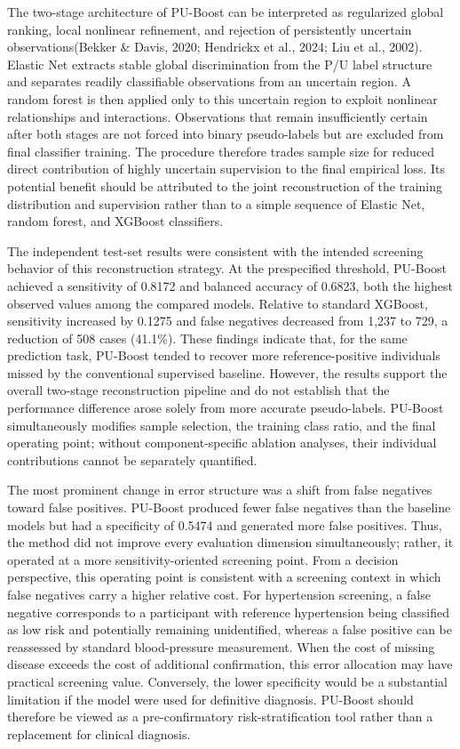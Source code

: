 \documentclass[10pt]{article}
\begin{document}
The two-stage architecture of PU-Boost can be interpreted as regularized
global ranking, local nonlinear refinement, and rejection of
persistently uncertain observations(Bekker \& Davis, 2020; Hendrickx et
al., 2024; Liu et al., 2002). Elastic Net extracts stable global
discrimination from the P/U label structure and separates readily
classifiable observations from an uncertain region. A random forest is
then applied only to this uncertain region to exploit nonlinear
relationships and interactions. Observations that remain insufficiently
certain after both stages are not forced into binary pseudo-labels but
are excluded from final classifier training. The procedure therefore
trades sample size for reduced direct contribution of highly uncertain
supervision to the final empirical loss. Its potential benefit should be
attributed to the joint reconstruction of the training distribution and
supervision rather than to a simple sequence of Elastic Net, random
forest, and XGBoost classifiers.

The independent test-set results were consistent with the intended
screening behavior of this reconstruction strategy. At the prespecified
threshold, PU-Boost achieved a sensitivity of 0.8172 and balanced
accuracy of 0.6823, both the highest observed values among the compared
models. Relative to standard XGBoost, sensitivity increased by 0.1275
and false negatives decreased from 1,237 to 729, a reduction of 508
cases (41.1\%). These findings indicate that, for the same prediction
task, PU-Boost tended to recover more reference-positive individuals
missed by the conventional supervised baseline. However, the results
support the overall two-stage reconstruction pipeline and do not
establish that the performance difference arose solely from more
accurate pseudo-labels. PU-Boost simultaneously modifies sample
selection, the training class ratio, and the final operating point;
without component-specific ablation analyses, their individual
contributions cannot be separately quantified.

The most prominent change in error structure was a shift from false
negatives toward false positives. PU-Boost produced fewer false
negatives than the baseline models but had a specificity of 0.5474 and
generated more false positives. Thus, the method did not improve every
evaluation dimension simultaneously; rather, it operated at a more
sensitivity-oriented screening point. From a decision perspective, this
operating point is consistent with a screening context in which false
negatives carry a higher relative cost. For hypertension screening, a
false negative corresponds to a participant with reference hypertension
being classified as low risk and potentially remaining unidentified,
whereas a false positive can be reassessed by standard blood-pressure
measurement. When the cost of missing disease exceeds the cost of
additional confirmation, this error allocation may have practical
screening value. Conversely, the lower specificity would be a
substantial limitation if the model were used for definitive diagnosis.
PU-Boost should therefore be viewed as a pre-confirmatory
risk-stratification tool rather than a replacement for clinical
diagnosis.
\end{document}
